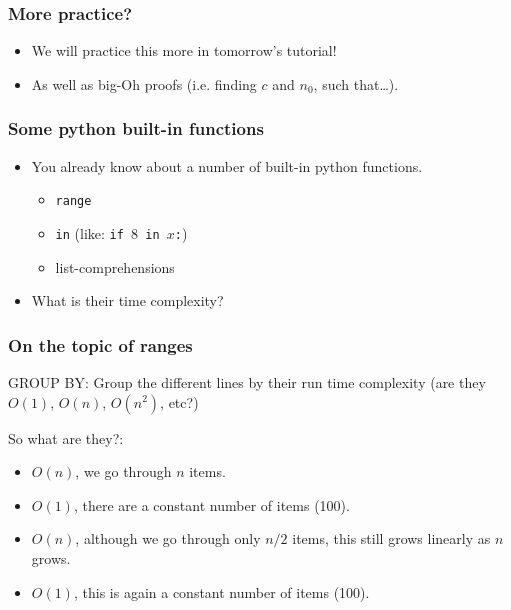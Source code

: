 \begin{frame}
	\frametitle{More practice?}
	\begin{itemize}
		\item We will practice this more in tomorrow's tutorial!
		\item As well as big-Oh proofs (i.e. finding $c$ and $n_0$, such that\dots).
	\end{itemize}
\end{frame}

\begin{frame}
	\frametitle{Some python built-in functions}
	\begin{itemize}
		\item You already know about a number of built-in python functions.
			\begin{itemize}
				\item \texttt{range}
			
				\item \texttt{in} (like: \texttt{if $8$ in $x$:})
			
				\item list-comprehensions
			\end{itemize}
			
		\item What is their time complexity?
	\end{itemize}	
\end{frame}

\begin{frame}
	\frametitle{On the topic of ranges}



		
		GROUP BY:	Group the different lines by their run time complexity (are they $O(1)$, $O(n)$, $O(n^2)$, etc?)

	
	So what are they?:
		\begin{itemize}
			\item $O(n)$, we go through $n$ items.
			\item $O(1)$, there are a constant number of items (100).
			\item $O(n)$, although we go through only $n/2$ items, this still grows linearly as $n$ grows.
			\item $O(1)$, this is again a constant number of items (100).
		\end{itemize}
		
					

\end{frame}

